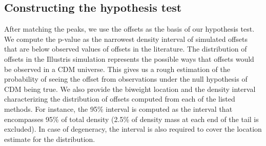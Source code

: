 \subsection{Constructing the hypothesis test} 

After matching the peaks, we use the offsets as the basis of our 
 hypothesis test. 
We compute the p-value as the narrowest density interval of simulated offsets 
that are below observed values of 
offsets in the literature. The distribution of offsets in the Illustris
simulation represents the possible ways that offsets would be observed in a CDM
universe.
This gives us a rough estimation of the probability 
of seeing the offset from observations under the null hypothesis of CDM 
being true. We also provide the biweight location and the density interval 
characterizing the 
distribution of offsets computed from each of the listed methods.
For instance, the 95\% interval is computed as the interval that encompasses
95\% of total density (2.5\% of density mass at each end of the tail is
excluded). In case of degeneracy, the interval is also required to cover the 
location estimate for the distribution.

